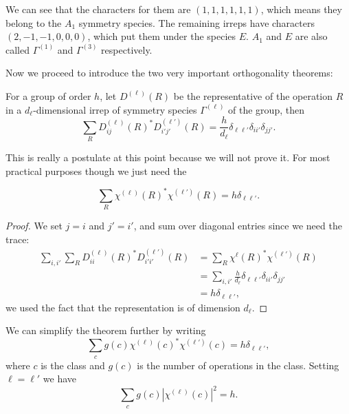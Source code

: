 We can see that the characters for them are $(1,1,1,1,1,1)$, which means they 
belong to the $A_1$ symmetry species. The remaining irreps have characters 
$(2,-1,-1,0,0,0)$, which put them under the species $E$. $A_1$ and $E$ are also 
called $\Gamma^{(1)}$ and $\Gamma^{(3)}$ respectively. \par
Now we proceed to introduce the two very important orthogonality theorems:
\begin{thrm}
For a group of order $h$, let $D^{(\ell)}(R)$ be the representative of the 
operation $R$ in a $d_{\ell}$-dimensional irrep of symmetry species $\Gamma^{(\ell)}$ of 
the group, then
\begin{equation}
\sum_R D_{ij}^{(\ell)}(R)^*D_{i'j'}^{(\ell')}(R)=\frac{h}{d_{\ell}}\delta_{\ell\ell'}\delta_{ii'}\delta_{jj'}.
\end{equation}
\end{thrm}
This is really a postulate at this point because we will not prove it. 
For most practical purposes though we just need the 
\begin{thrm}
\begin{equation}
\sum_R\chi^{(\ell)}(R)^*\chi^{(\ell')}(R)=h\delta_{\ell\ell'}.
\end{equation}
\end{thrm}
\begin{proof}
We set $j=i$ and $j'=i'$, and sum over diagonal entries since we need the trace:
\begin{equation}
\begin{aligned}
\sum_{i,i'}\sum_R D_{ii}^{(\ell)}(R)^*D_{i'i'}^{(\ell')}(R)&=\sum_R\chi^{\ell}(R)^*\chi^{(\ell')}(R)\\
&=\sum_{i,i'}\frac{h}{d_{\ell}}\delta_{\ell\ell'}\delta_{ii'}\delta_{jj'}\\
&=h\delta_{\ell\ell'}, 
\end{aligned}
\end{equation}
we used the fact that the representation is of dimension $d_{\ell}$.
\end{proof}
We can simplify the theorem further by writing 
\begin{equation}
\sum_cg(c)\chi^{(\ell)}(c)^*\chi^{(\ell')}(c)=h\delta_{\ell\ell'},
\end{equation}
where $c$ is the class and $g(c)$ is the number of operations in the class. 
Setting $\ell=\ell'$ we have
\begin{equation}
\sum_cg(c)|\chi^{(\ell)}(c)|^2=h.
\end{equation}
